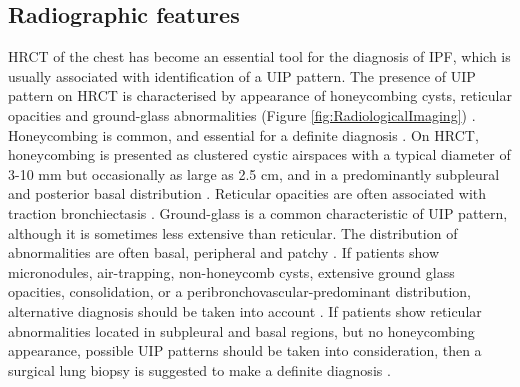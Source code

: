 \subsection{Radiographic features} \label{RadiographicFeatures}
HRCT of the chest has become an essential tool for the diagnosis of IPF, which is usually associated with identification of a UIP pattern. The presence of UIP pattern on HRCT is characterised by appearance of honeycombing cysts, reticular opacities and ground-glass abnormalities (Figure \ref{fig:RadiologicalImaging}) \citep{king2011idiopathic,raghu2011official,richeldi2017idiopathic}. Honeycombing is common, and essential for a definite diagnosis \citep{raghu2011official}. On HRCT, honeycombing is presented as clustered cystic airspaces with a typical diameter of 3-10 mm but occasionally as large as 2.5 cm, and in a predominantly subpleural and posterior basal distribution \citep{hansell2008fleischner,richeldi2017idiopathic}. Reticular opacities are often associated with traction bronchiectasis \citep{nishimura1992usual, johkoh1999idiopathic}. Ground-glass is a common characteristic of UIP pattern, although it is sometimes less extensive than reticular. The distribution of abnormalities are often basal, peripheral and patchy \citep{raghu2011official}. If patients show micronodules, air-trapping, non-honeycomb cysts, extensive ground glass opacities, consolidation, or a peribronchovascular-predominant distribution, alternative diagnosis should be taken into account \citep{hwang2009computed, souza2006idiopathic}. If patients show reticular abnormalities located in subpleural and basal regions, but no honeycombing appearance, possible UIP patterns should be taken into consideration, then a surgical lung biopsy is suggested to make a definite diagnosis \citep{raghu2011official,richeldi2017idiopathic}. 

